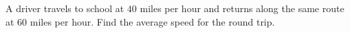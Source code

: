 A driver travels to school at $ 40 $ miles per hour and returns along the same route at $ 60 $ miles per hour. Find the average speed for the round trip.
